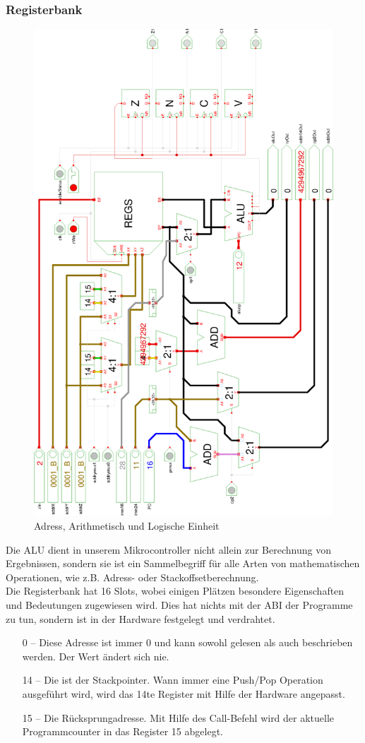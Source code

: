 \subsubsection{Registerbank}
\begin{figure}[!ht]
\centering
\includegraphics[width=.8\textwidth]{images/alu.eps}
\caption{\label{HW:ALU}Adress, Arithmetisch und Logische Einheit}
\end{figure}
Die ALU dient in unserem Mikrocontroller nicht allein zur Berechnung von Ergebnissen, sondern sie ist ein Sammelbegriff für alle Arten von mathematischen Operationen, wie z.B. Adress- oder Stackoffsetberechnung.\\
Die Registerbank hat 16 Slots, wobei einigen Plätzen besondere Eigenschaften und Bedeutungen zugewiesen wird. Dies hat nichts mit der ABI der Programme zu tun, sondern ist in der Hardware festgelegt und verdrahtet.
\begin{itemize}
  \item[0 --] Diese Adresse ist immer 0 und kann sowohl gelesen als auch beschrieben werden. Der Wert ändert sich nie.
  \item[14 --] Die ist der Stackpointer. Wann immer eine Push/Pop Operation ausgeführt wird, wird das 14te Register mit Hilfe der Hardware angepasst.
  \item[15 --] Die Rücksprungadresse. Mit Hilfe des Call-Befehl wird der aktuelle Programmcounter in das Register 15 abgelegt.
\end{itemize}

